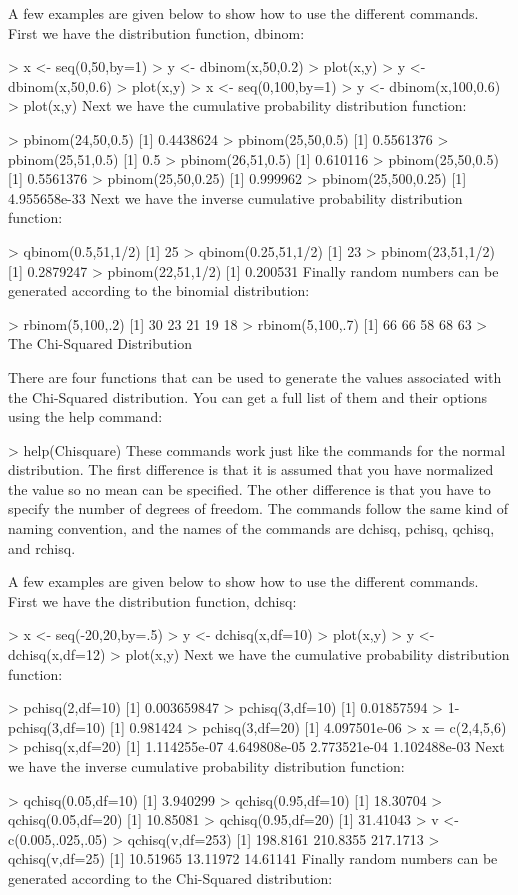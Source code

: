\documentclass[a4paper,12pt]{article}
\begin{document}
A few examples are given below to show how to use the different commands. First we have the distribution function, dbinom:

> x <- seq(0,50,by=1)
> y <- dbinom(x,50,0.2)
> plot(x,y)
> y <- dbinom(x,50,0.6)
> plot(x,y)
> x <- seq(0,100,by=1)
> y <- dbinom(x,100,0.6)
> plot(x,y)
Next we have the cumulative probability distribution function:

> pbinom(24,50,0.5)
[1] 0.4438624
> pbinom(25,50,0.5)
[1] 0.5561376
> pbinom(25,51,0.5)
[1] 0.5
> pbinom(26,51,0.5)
[1] 0.610116
> pbinom(25,50,0.5)
[1] 0.5561376
> pbinom(25,50,0.25)
[1] 0.999962
> pbinom(25,500,0.25)
[1] 4.955658e-33
Next we have the inverse cumulative probability distribution function:

> qbinom(0.5,51,1/2)
[1] 25
> qbinom(0.25,51,1/2)
[1] 23
> pbinom(23,51,1/2)
[1] 0.2879247
> pbinom(22,51,1/2)
[1] 0.200531
Finally random numbers can be generated according to the binomial distribution:

> rbinom(5,100,.2) 
[1] 30 23 21 19 18
> rbinom(5,100,.7)
[1] 66 66 58 68 63
> 
The Chi-Squared Distribution

There are four functions that can be used to generate the values associated with the Chi-Squared distribution. You can get a full list of them and their options using the help command:

> help(Chisquare)
These commands work just like the commands for the normal distribution. The first difference is that it is assumed that you have normalized the value so no mean can be specified. The other difference is that you have to specify the number of degrees of freedom. The commands follow the same kind of naming convention, and the names of the commands are dchisq, pchisq, qchisq, and rchisq.

A few examples are given below to show how to use the different commands. First we have the distribution function, dchisq:

> x <- seq(-20,20,by=.5)
> y <- dchisq(x,df=10)
> plot(x,y)
> y <- dchisq(x,df=12)
> plot(x,y)
Next we have the cumulative probability distribution function:

> pchisq(2,df=10)
[1] 0.003659847
> pchisq(3,df=10)
[1] 0.01857594
> 1-pchisq(3,df=10)
[1] 0.981424
> pchisq(3,df=20)
[1] 4.097501e-06
> x = c(2,4,5,6)
> pchisq(x,df=20)
[1] 1.114255e-07 4.649808e-05 2.773521e-04 1.102488e-03
Next we have the inverse cumulative probability distribution function:

> qchisq(0.05,df=10)
[1] 3.940299
> qchisq(0.95,df=10)
[1] 18.30704
> qchisq(0.05,df=20)
[1] 10.85081
> qchisq(0.95,df=20)
[1] 31.41043
> v <- c(0.005,.025,.05)
> qchisq(v,df=253)
[1] 198.8161 210.8355 217.1713
> qchisq(v,df=25)
[1] 10.51965 13.11972 14.61141
Finally random numbers can be generated according to the Chi-Squared distribution:
\end{document}

